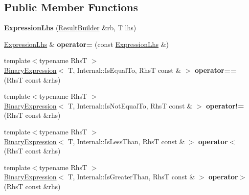 \subsection*{Public Member Functions}
\begin{DoxyCompactItemize}
\item 
\mbox{\label{classCatch_1_1ExpressionLhs_aa829588def6146a94fb75de9c4cc482a}} 
{\bfseries Expression\+Lhs} (\hyperlink{classCatch_1_1ResultBuilder}{Result\+Builder} \&rb, T lhs)
\item 
\mbox{\label{classCatch_1_1ExpressionLhs_a60d50fe8adcaabcb7c93747ddbae5993}} 
\hyperlink{classCatch_1_1ExpressionLhs}{Expression\+Lhs} \& {\bfseries operator=} (const \hyperlink{classCatch_1_1ExpressionLhs}{Expression\+Lhs} \&)
\item 
\mbox{\label{classCatch_1_1ExpressionLhs_abebe4afc079c91ae548ab8fdba6c77f2}} 
{\footnotesize template$<$typename RhsT $>$ }\\\hyperlink{classCatch_1_1BinaryExpression}{Binary\+Expression}$<$ T, Internal\+::\+Is\+Equal\+To, RhsT const  \& $>$ {\bfseries operator==} (RhsT const \&rhs)
\item 
\mbox{\label{classCatch_1_1ExpressionLhs_a3bc08bb2b9c27678e2628faa73645144}} 
{\footnotesize template$<$typename RhsT $>$ }\\\hyperlink{classCatch_1_1BinaryExpression}{Binary\+Expression}$<$ T, Internal\+::\+Is\+Not\+Equal\+To, RhsT const  \& $>$ {\bfseries operator!=} (RhsT const \&rhs)
\item 
\mbox{\label{classCatch_1_1ExpressionLhs_a919c48e52ff1be5f7329920d4da8e92f}} 
{\footnotesize template$<$typename RhsT $>$ }\\\hyperlink{classCatch_1_1BinaryExpression}{Binary\+Expression}$<$ T, Internal\+::\+Is\+Less\+Than, RhsT const  \& $>$ {\bfseries operator$<$} (RhsT const \&rhs)
\item 
\mbox{\label{classCatch_1_1ExpressionLhs_a52981d92ec6aad872660ae7df1abb33a}} 
{\footnotesize template$<$typename RhsT $>$ }\\\hyperlink{classCatch_1_1BinaryExpression}{Binary\+Expression}$<$ T, Internal\+::\+Is\+Greater\+Than, RhsT const  \& $>$ {\bfseries operator$>$} (RhsT const \&rhs)

\end{DoxyCompactItemize}
